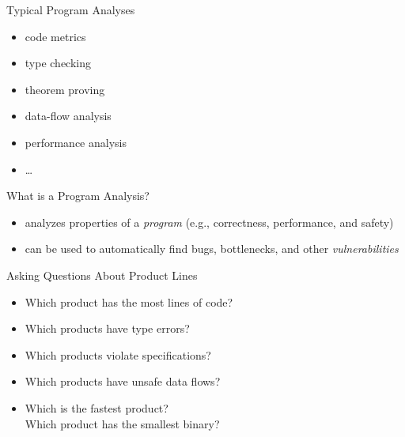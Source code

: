 \begin{frame}{\myframetitle}
	\begin{fancycolumns}[t,widths={47}]
		\begin{note}{Typical Program Analyses}
			\begin{fancycolumns}[c,animation=none]
				\begin{itemize}
					\item code metrics
					\item type checking
					\item theorem proving
					\item data-flow analysis
					\item performance analysis
					\item \ldots
				\end{itemize}
			\nextcolumn
				\centering{}
			\end{fancycolumns}
		\end{note}
		\begin{definition}{What is a Program Analysis?}
			\begin{itemize}
				\item analyzes properties of a \emph{program} (e.g., correctness, performance, and safety)
				\item can be used to automatically find bugs, bottlenecks, and other \emph{vulnerabilities}
			\end{itemize}
		\end{definition}
		\nextcolumn
		\begin{example}{Asking Questions About Product Lines}
			\begin{itemize}
				\item Which product has the most lines of code? 
				\item Which products have type errors? 
				\item Which products violate specifications? 
				\item Which products have unsafe data flows? 
				\item Which is the fastest product? \\
					Which product has the smallest binary? 

\end{itemize}
\end{example}
\end{fancycolumns}
\end{frame}
